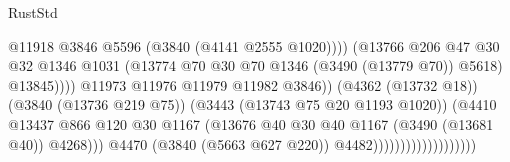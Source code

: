 \begin{lexlean}{RustStd}
\begin{coremodule}
{\begin{coremodule}
{{{{{{{{{{{{{{{{{{{{{{{{{{                                                          @11918
                                                          @3846
                                                          @5596
                                                          (@3840 (@4141 @2555 @1020))))
                                                      (@13766
                                                        @206
                                                        @47
                                                        @30
                                                        @32
                                                        @1346
                                                        @1031
                                                        (@13774
                                                          @70
                                                          @30
                                                          @70
                                                          @1346
                                                          (@3490 (@13779 @70))
                                                          @5618)
                                                        @13845))))
                                                @11973
                                                @11976
                                                @11979
                                                @11982
                                                @3846))
                                            (@4362 (@13732 @18))
                                            (@3840 (@13736 @219 @75))
                                            (@3443 (@13743 @75 @20 @1193 @1020))
                                            (@4410
                                              @13437
                                              @866
                                              @120
                                              @30
                                              @1167
                                              (@13676
                                                @40
                                                @30
                                                @40
                                                @1167
                                                (@3490 (@13681 @40))
                                                @4268)))
                                          @4470
                                          (@3840 (@5663 @627 @220))
                                          @4482)))))))))))))))))))
}}}}}}}}}}}}}}}}}}}}}}}}}}
\end{coremodule}}
\end{coremodule}
\end{lexlean}
